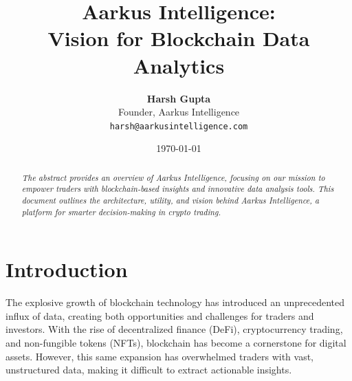 \documentclass{article}
\title{\Huge \textbf{Aarkus Intelligence: \\ Vision for Blockchain Data Analytics}}
\author{
  \textbf{Harsh Gupta} \\
  Founder, Aarkus Intelligence \\
  \texttt{harsh@aarkusintelligence.com}
}
\date{\today}
\begin{document}
\maketitle
\thispagestyle{empty} %

\begin{abstract}
\textit{
The abstract provides an overview of Aarkus Intelligence, focusing on our mission to empower traders with blockchain-based insights and innovative data analysis tools. This document outlines the architecture, utility, and vision behind Aarkus Intelligence, a platform for smarter decision-making in crypto trading.
}
\end{abstract}

\tableofcontents

\newpage

\section{Introduction}
The explosive growth of blockchain technology has introduced an unprecedented influx of data, creating both opportunities and challenges for traders and investors. With the rise of decentralized finance (DeFi), cryptocurrency trading, and non-fungible tokens (NFTs), blockchain has become a cornerstone for digital assets. However, this same expansion has overwhelmed traders with vast, unstructured data, making it difficult to extract actionable insights.


  
  
  
  
\end{document}
